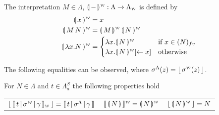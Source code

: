 \documentclass[a4paper,UKenglish,cleveref, autoref]{lipics-v2019}
\newcommand{\FALC}{\Lambda^{S}_{a}}
\newcommand{\WEAK}{\Lambda_{\weaksymbol}}
\newcommand{\fv}[1]{(#1)_{fv}}
\newcommand{\abs}[2]{\lambda #1 . #2}
\newcommand{\app}[2]{#1 \, #2}
\newcommand{\share}[3]{#1 [#2 \leftarrow #3]}
\newcommand{\compile}[1]{\llparenthesis \, #1 \, \rrparenthesis}
\newcommand{\weaksymbol}{\mbox{\tiny $\mathcal{W}$}}
\newcommand{\readbackwmap}[3]{\llbracket \, #1 \, \vert \, #2 \, \vert \, #3  \, \rrbracket }
\newcommand{\readweakwmap}[3]{\llbracket \, #1 \, \vert \, #2 \, \vert \, #3  \, \rrbracket_{\weaksymbol} }
\newcommand{\compweak}[1]{\llparenthesis \, #1 \, \rrparenthesis^{\weaksymbol}}
\newcommand{\readbackweak}[1]{\lfloor \, #1 \, \rfloor}
\newcommand{\composeweak}[1]{\llbracket \, #1 \, \rrbracket^{\weaksymbol}}
\begin{document}
\begin{definition}
\label{def:transweak}
The interpretation $M \in \Lambda$, $\compweak{-} : \Lambda \rightarrow \WEAK$ is defined by
\begin{align*}
	\compweak{x} &= x \\
	\compweak{\app{M}{N}} &= \app{\compweak{M}}{\compweak{N}} \\
	\compweak{\abs{x}{N}} &= 
	\begin{cases}
		\abs{x}{\compweak{N}} & \text{if } x \in \fv{N} \\
		\abs{x}{\compweak{N} \share{}{}{x}} & \text{otherwise}
	\end{cases}
\end{align*}
\end{definition}
\noindent The following equalities can be observed, where $\sigma^{\Lambda}(z) = \readbackweak{\sigma^{\weaksymbol}(z)} $.
\begin{proposition}
\label{prop:equalterms}
For $N \in \Lambda$ and $t \in \FALC$ the following properties hold
\begin{center}
\begin{tabular}{c@{\hskip 0.5in} c@{\hskip 0.5in} c}
	$\readbackweak{\readweakwmap{t}{\sigma^{\weaksymbol}}{\gamma}} = \readbackwmap{t}{\sigma^{\Lambda}}{\gamma}$
	&
	$\composeweak{\compile{N}} = \compweak{N}$
	&
	$\readbackweak{\compweak{N}} = N$
\end{tabular}

\end{center}

\end{proposition}
\end{document}
